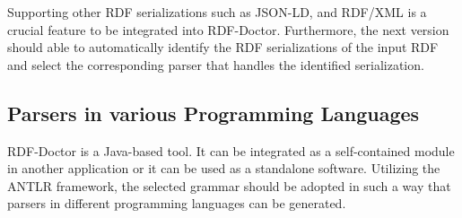 Supporting other RDF serializations such as JSON-LD, and RDF/XML is a crucial feature to be integrated into RDF-Doctor. 
Furthermore, the next version should able to automatically identify the RDF serializations of the input RDF and select the corresponding parser that handles the identified serialization.     

\subsection{Parsers in various Programming Languages}

RDF-Doctor is a  Java-based tool. It can be integrated as a self-contained module in another application or it can be used as a standalone software.  
Utilizing the ANTLR framework, the selected grammar should be adopted in such a way that parsers in different programming languages can be generated.%

